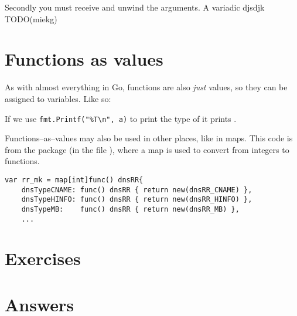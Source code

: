 Secondly you must receive and unwind the arguments. A variadic
djsdjk TODO(miekg)

\section{Functions as values}
\label{sec:functions as values}
As with almost everything in Go, functions are also \emph{just} values,
so they can be assigned to variables. Like so:

If we use \lstinline{fmt.Printf("%T\n", a)} to print the type of  it prints
.

Functions--as--values may also be used in other places, like in maps.
This code is from the package  (in the file
), where a map is used to convert
from integers to functions.
\begin{lstlisting}[caption=Function as values in maps]
var rr_mk = map[int]func() dnsRR{
    dnsTypeCNAME: func() dnsRR { return new(dnsRR_CNAME) },
    dnsTypeHINFO: func() dnsRR { return new(dnsRR_HINFO) },
    dnsTypeMB:    func() dnsRR { return new(dnsRR_MB) },
    ...
\end{lstlisting}


\section{Exercises}










\cleardoublepage
\section{Answers}
\shipoutAnswer

